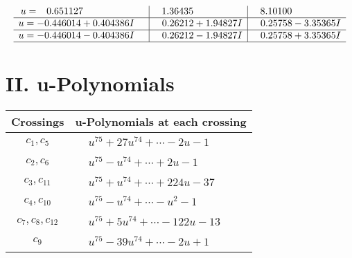 \documentclass[1p]{elsarticle_modified}
\theoremstyle{definition}
\begin{document}
$$\begin{array}{c|c|c}
\begin{aligned}
u &= \phantom{-}0.651127\phantom{ +0.000000I}\end{aligned}
 & \phantom{-}1.36435\phantom{ +0.000000I} & \phantom{-}8.10100\phantom{ +0.000000I} \\ \hline\begin{aligned}
u &= -0.446014 + 0.404386 I\end{aligned}
 & \phantom{-}0.26212 + 1.94827 I & \phantom{-}0.25758 - 3.35365 I \\ \hline\begin{aligned}
u &= -0.446014 - 0.404386 I\end{aligned}
 & \phantom{-}0.26212 - 1.94827 I & \phantom{-}0.25758 + 3.35365 I\\
 \hline 
 \end{array}$$\newpage
\newpage\renewcommand{\arraystretch}{1}
\centering \section*{ II. u-Polynomials}
\begin{tabular}{m{50pt}|m{274pt}}
Crossings & \hspace{64pt}u-Polynomials at each crossing \\
\hline $$\begin{aligned}c_{1},c_{5}\end{aligned}$$&$\begin{aligned}
&u^{75}+27 u^{74}+\cdots-2 u-1
\end{aligned}$\\
\hline $$\begin{aligned}c_{2},c_{6}\end{aligned}$$&$\begin{aligned}
&u^{75}- u^{74}+\cdots+2 u-1
\end{aligned}$\\
\hline $$\begin{aligned}c_{3},c_{11}\end{aligned}$$&$\begin{aligned}
&u^{75}+u^{74}+\cdots+224 u-37
\end{aligned}$\\
\hline $$\begin{aligned}c_{4},c_{10}\end{aligned}$$&$\begin{aligned}
&u^{75}- u^{74}+\cdots- u^2-1
\end{aligned}$\\
\hline $$\begin{aligned}c_{7},c_{8},c_{12}\end{aligned}$$&$\begin{aligned}
&u^{75}+5 u^{74}+\cdots-122 u-13
\end{aligned}$\\
\hline $$\begin{aligned}c_{9}\end{aligned}$$&$\begin{aligned}
&u^{75}-39 u^{74}+\cdots-2 u+1
\end{aligned}$\\
\hline
\end{tabular}\newpage\renewcommand{\arraystretch}{1}
\end{document}
